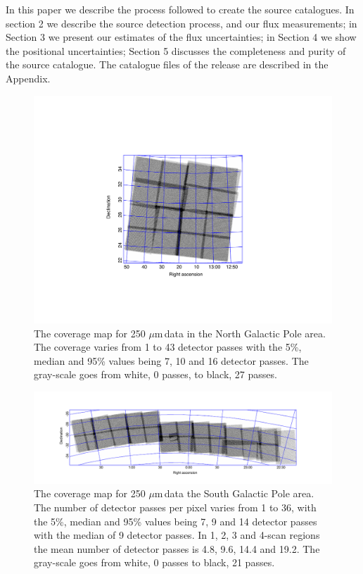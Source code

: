\documentclass[useAMS,usenatbib]{mn2e}
\def\mic{ $\mu $m\,}
\begin{document}
In this paper we describe the process followed to create the source
catalogues. In section 2 we describe the source detection process, and
our flux measurements; in Section 3 we present our estimates of the
flux uncertainties; in Section 4 we show the positional uncertainties;
Section 5 discusses the completeness and purity of the source
catalogue. The catalogue files of the release are described in the
Appendix.


\begin{figure} %
\includegraphics[scale=0.7]{ngpcoverage.pdf}
\caption{\protect\label{skymapn} The coverage map for 250\mic data
  in the North Galactic Pole area. The coverage varies from 1 to 43
  detector passes with the 5\%, median and 95\% values being 7, 10 and
  16 detector passes. The gray-scale goes from white, 0 passes, to
  black, 27 passes.}

\end{figure}

\begin{figure} %
\includegraphics[scale=1.]{sgpcoverage.pdf}
\caption{ \protect\label{skymaps} The coverage map for 250\mic data
  the South Galactic Pole area.  The number of detector passes per
  pixel varies from 1 to 36, with the 5\%, median and 95\% values
  being 7, 9 and 14 detector passes with the median of 9 detector
  passes. In 1, 2, 3 and 4-scan regions the mean number of detector
  passes is 4.8, 9.6, 14.4 and 19.2. The gray-scale goes from white, 0
  passes to black, 21 passes.  }

\end{figure}
\end{document}
